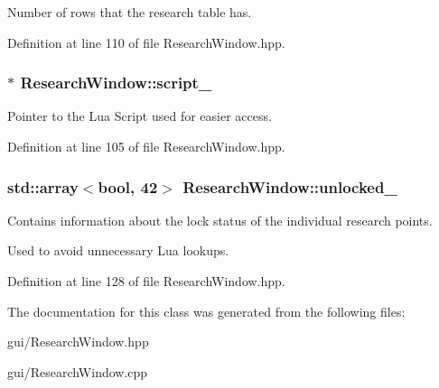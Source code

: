 Number of rows that the research table has. 



Definition at line 110 of file Research\+Window.\+hpp.

\subsubsection[{\texorpdfstring{script\+\_\+}{script_}}]{$\ast$ Research\+Window\+::script\+\_\+\hspace{0.3cm}{\ttfamily [private]}}\hypertarget{class_research_window_af7f3013563f378a37e3b70c8fea0b555}{}\label{class_research_window_af7f3013563f378a37e3b70c8fea0b555}


Pointer to the Lua Script used for easier access. 



Definition at line 105 of file Research\+Window.\+hpp.

\subsubsection[{\texorpdfstring{unlocked\+\_\+}{unlocked_}}]{\setlength{\rightskip}{0pt plus 5cm}std\+::array$<$bool, 42$>$ Research\+Window\+::unlocked\+\_\+\hspace{0.3cm}{\ttfamily [private]}}\hypertarget{class_research_window_a7e531797d054408609f43d633a43c07c}{}\label{class_research_window_a7e531797d054408609f43d633a43c07c}


Contains information about the lock status of the individual research points. 

Used to avoid unnecessary Lua lookups. 

Definition at line 128 of file Research\+Window.\+hpp.



The documentation for this class was generated from the following files\+:\begin{DoxyCompactItemize}
\item 
gui/Research\+Window.\+hpp\item 
gui/Research\+Window.\+cpp\end{DoxyCompactItemize}
